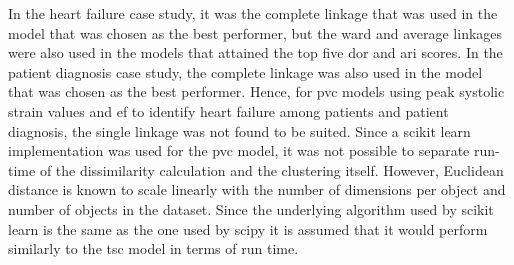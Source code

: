 In the heart failure case study, it was the complete linkage that was used in the model that was chosen as the best performer, but the ward and average linkages were also used in the models that attained the top five \acrshort{dor} and \acrshort{ari} scores. In the patient diagnosis case study, the complete linkage was also used in the model that was chosen as the best performer. Hence, for \acrshort{pvc} models using peak systolic strain values and \acrshort{ef} to identify heart failure among patients and patient diagnosis, the single linkage was not found to be suited. \bigskip
Since a scikit learn implementation was used for the \acrshort{pvc} model, it was not possible to separate run-time of the dissimilarity calculation and the clustering itself. However, Euclidean distance is known to scale linearly with the number of dimensions per object and number of objects in the dataset. Since the underlying algorithm used by scikit learn is the same as the one used by scipy it is assumed that it would perform similarly to the \acrshort{tsc} model in terms of run time. \bigskip

